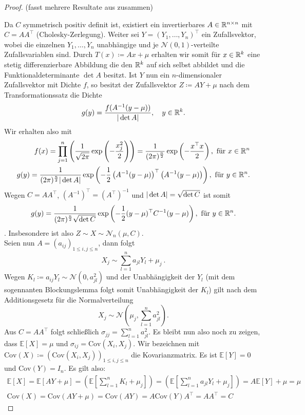 \begin{proof}(fasst mehrere Resultate aus \cite{brokate2016grundwissen} zusammen)
	
	Da $ C $ symmetrisch positiv definit ist, existiert ein invertierbares $ A \in \mathbb{R}^{n \times n} $ mit $ C = AA^{\top} $ (Cholesky-Zerlegung).
	Weiter sei $ Y = (Y_1,\dots,Y_n)^{\top} $ ein Zufallsvektor, wobei die einzelnen $ Y_1,\dots,Y_n $ unabhängige und je $ \mathcal{N}(0,1) $-verteilte Zufallsvariablen sind. 
	Durch $ T(x) \coloneqq Ax + \mu $ erhalten wir somit für $ x \in \mathbb{R}^k $ eine stetig differenzierbare Abbildung die den $ \mathbb{R}^k $ auf sich selbst abbildet und die Funktionaldeterminante $ \det A$ besitzt.
	Ist $ Y $ nun ein $ n $-dimensionaler Zufallsvektor mit Dichte $ f $, so besitzt der Zufallsvektor $ Z \coloneqq  AY + \mu$ nach dem Transformationssatz die Dichte
	\[
		g(y) = \frac{f(A^{-1}(y-\mu))}{| \det A |}, \quad y \in \mathbb{R}^k .
	\]
	Wir erhalten also mit 
	\begin{align*}
		f(x) = \prod_{j=1}^n \left( \frac{1}{\sqrt{2\pi}}\exp\left(-\frac{x_j^2}{2}\right) \right) = \frac{1}{(2\pi)^{\frac{n}{2}}} \exp \left( - \frac{x^{\top}x}{2}\right), \text{ für } x \in \mathbb{R}^n \\
		g(y) = \frac{1}{(2\pi)^{\frac{n}{2}}| \det A |} \exp \left( - \frac{1}{2} \left( A^{-1}(y-\mu)\right)^{\top}\left( A^{-1}(y-\mu)\right)\right), \text{ für }y \in \mathbb{R}^n .
	\end{align*}
	Wegen $ C = A A^{\top} $, $ (A^{-1})^{\top} = (A^{\top})^{-1} $ und $ | \det A | = \sqrt{\det C} $ ist somit 
	\[
		g(y) = \frac{1}{(2\pi)^{\frac{n}{2}}\sqrt{\det C}} \exp \left( - \frac{1}{2} (y-\mu)^{\top}C^{-1} (y-\mu)\right), \text{ für }y \in \mathbb{R}^n.
	\].
	Insbesondere ist also $ Z \sim X \sim \mathcal{N}_n(\mu,C) $.\\
	Seien nun $ A = (a_{ij})_{1 \leq i,j \leq n} $, dann folgt
	\[
		X_j \sim \sum_{l=1}^n a_{jl} Y_l + \mu_j \ .
	\]
	Wegen $ K_l \coloneqq a_{ij} Y_l  \sim \mathcal{N}(0,a_{jl}^2) $ und der Unabhängigkeit der $ Y_l $ (mit dem sogennanten Blockungslemma folgt somit Unabhängigkeit der $ K_l $) gilt nach dem Additionsgesetz für die Normalverteilung 
	\[
		X_j\sim \mathcal{N} \left( \mu_j,\sum_{l=1}^{n}a_{jl}^2 \right).
	\]
	Aus $ C = A A^{\top}  $ folgt schließlich $ \sigma_{jj} = \sum_{l=1}^{n} a_{jl}^2 $.
	Es bleibt nun also noch zu zeigen, dass $ \mathbb{E}[X] = \mu $ und $ \sigma_{ij} = \text{Cov}(X_i,X_j) $.
	Wir bezeichnen mit $ \text{Cov}(X) \coloneqq (\text{Cov}(X_i,X_j))_{1 \leq i,j \leq n} $
	die Kovarianzmatrix.
	Es ist $ \mathbb{E}[Y] = 0 $ und  $\text{Cov}(Y) = I_n $.
	Es gilt also:
	\begin{align*}
		\mathbb{E}[X] = \mathbb{E}[AY + \mu] = (\mathbb{E}[\sum_{l=1}^{n}K_l+\mu_j]) =(\mathbb{E}[\sum_{l=1}^{n}a_{jl}Y_l+\mu_j])= A \mathbb{E}[Y] + \mu = \mu \\
		\text{Cov}(X) = \text{Cov}(AY + \mu) =  \text{Cov}(AY) = A \text{Cov}(Y) A^{\top} = AA^{\top} = C
	\end{align*}	
	
\end{proof}
